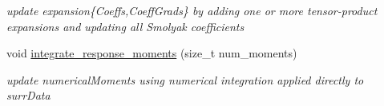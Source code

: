 \begin{DoxyCompactItemize}
\begin{DoxyCompactList}\small\item\em update expansion\{Coeffs,Coeff\+Grads\} by adding one or more tensor-\/product expansions and updating all Smolyak coefficients \end{DoxyCompactList}\item 
void \hyperlink{classPecos_1_1ProjectOrthogPolyApproximation_a9e2f6de3dafca8df624fef2a132b5185}{integrate\+\_\+response\+\_\+moments} (size\+\_\+t num\+\_\+moments)\label{classPecos_1_1ProjectOrthogPolyApproximation_a9e2f6de3dafca8df624fef2a132b5185}

\begin{DoxyCompactList}\small\item\em update numerical\+Moments using numerical integration applied directly to surr\+Data \end{DoxyCompactList}\end{DoxyCompactItemize}
